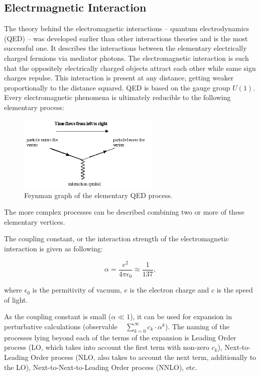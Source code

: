 \subsection{Electrmagnetic Interaction}

The theory behind the electromagnetic interactions -- quantum electrodynamics (QED) \cite{PhysRev.75.486} -- was developed earlier than other interactions theories
and is the most successful one. It describes the interactions between the elementary electrically charged fermions via mediator photons.
The electromagnetic interaction is such that the oppositely electrically charged objects attract each other while same sign charges repulse.
This interaction is present at any distance, getting weaker proportionally to the distance squared. QED is based on the gauge group $U(1)$.
Every electromagnetic phenomena is ultimately reducible to the following elementary process:

\begin{figure}[h]
  \centering
  \includegraphics[width=0.6\textwidth]{01_Theory_SM/plots/QED_simple.png}
  \caption{Feynman graph of the elementary QED process.}
  \label{fig:QED_simple}
\end{figure}

The more complex processes can be described combining two or more of these elementary vertices.

The coupling constant, or the interaction strength of the electromagnetic interaction is given as following:

\begin{equation}
 \alpha = \frac{e^{2}}{4\pi\epsilon_{0}} \approx \frac{1}{137},
\end{equation}

where $\epsilon_{0}$ is the permitivity of vacuum, $e$ is the electron charge and $c$ is the speed of light.

As the coupling constant is small ($\alpha \ll 1$), it can be used for expansion in perturbative calculations (observable ~ $\sum_{k=0}^{\infty} c_{k}\cdot\alpha^{k}$).
The naming of the processes lying beyond each of the terms of the expansion
is Leading Order process (LO, which takes into account the first term with non-zero $c_{k}$), Next-to-Leading Order process (NLO, also takes
to account the next term, additionally to the LO), Next-to-Next-to-Leading Order process (NNLO), etc.

